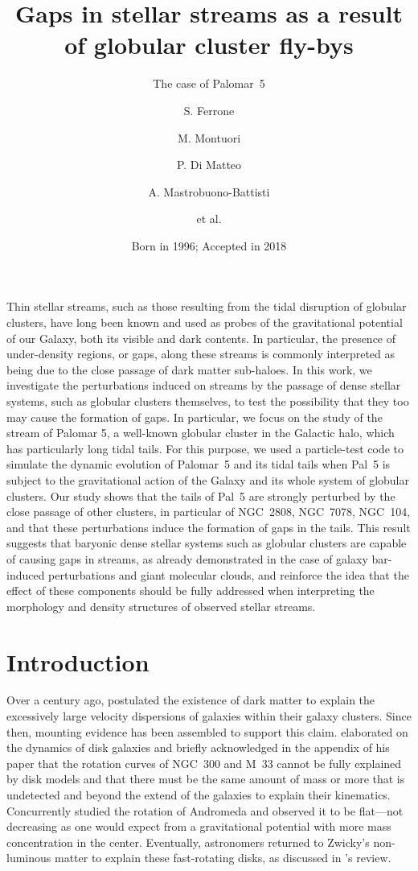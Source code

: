\documentclass{aa}
\title{Gaps in stellar streams as a result of globular cluster fly-bys}
\subtitle{The case of Palomar~5}
\author{S. Ferrone
       \inst{1,2}
         \and
       M. Montuori\inst{1}
       \and
       P. Di Matteo\inst{2}
       \and
       A. Mastrobuono-Battisti
       \and
       et al.
       }
\institute{Dipartimento di Fisica, Universit\`a di Roma ``La Sapienza'',
           Piazza Aldo Moro\\
           \email{salvatore.ferrone@uniroma1.it}
      \and
          Paris Observatory. Paris Sciences et Lettres\\
          \email{c.ptolemy@hipparch.uheaven.space}
          \thanks{The university of heaven temporarily does not
                  accept e-mails}
          }
\date{Born in 1996; Accepted in 2018}
\begin{document}
\abstract
  {Thin stellar streams, such as those resulting from the tidal disruption of globular clusters, have long been known and used as probes of the gravitational potential of our Galaxy, both its visible and dark contents. In particular, the presence of under-density regions, or gaps, along these streams is commonly interpreted as being due to the close passage of dark matter sub-haloes. }
  {In this work, we investigate the perturbations induced on streams by the passage of dense stellar systems, such as globular clusters themselves, to test the possibility that they too may cause the formation of gaps. In particular, we focus on the study of the stream of Palomar 5, a well-known globular cluster in the Galactic halo, which has particularly long tidal tails.  }
  {For this purpose, we used a particle-test code to simulate the dynamic evolution of Palomar~5 and its tidal tails when Pal~5 is subject to the gravitational action of the Galaxy and its whole system of globular clusters.}
  {Our study shows that the tails of Pal~5 are strongly perturbed by the close passage of other clusters, in particular of NGC~2808, NGC~7078, NGC~104, and that these perturbations induce the formation of gaps in the tails.}
  {This result suggests that baryonic dense stellar systems such as globular clusters are capable of causing gaps in streams, as already demonstrated in the case of galaxy bar-induced perturbations and giant molecular clouds, and reinforce the idea that the effect of these components should be fully addressed when interpreting the morphology and density structures of observed stellar streams.}


\maketitle
\section{Introduction}


  Over a century ago, \citet{1933AcHPh...6..110Z} postulated the existence of dark matter to explain the excessively large velocity dispersions of galaxies within their galaxy clusters. Since then, mounting evidence has been assembled to support this claim. \citet{1970IAUS...38..351F,1970ApJ...161..802F} elaborated on the dynamics of disk galaxies and briefly acknowledged in the appendix of his paper that the rotation curves of NGC~300 and M~33 cannot be fully explained by disk models and that there must be the same amount of mass or more that is undetected and beyond the extend of the galaxies to explain their kinematics. Concurrently \citet{1970ApJ...159..379R} studied the rotation of Andromeda and observed it to be flat---not decreasing as one would expect from a gravitational potential with more mass concentration in the center. Eventually, astronomers returned to Zwicky's non-luminous matter to explain these fast-rotating disks, as discussed in \citet{1983SciAm.248f..96R}'s review.
  
\end{document}

